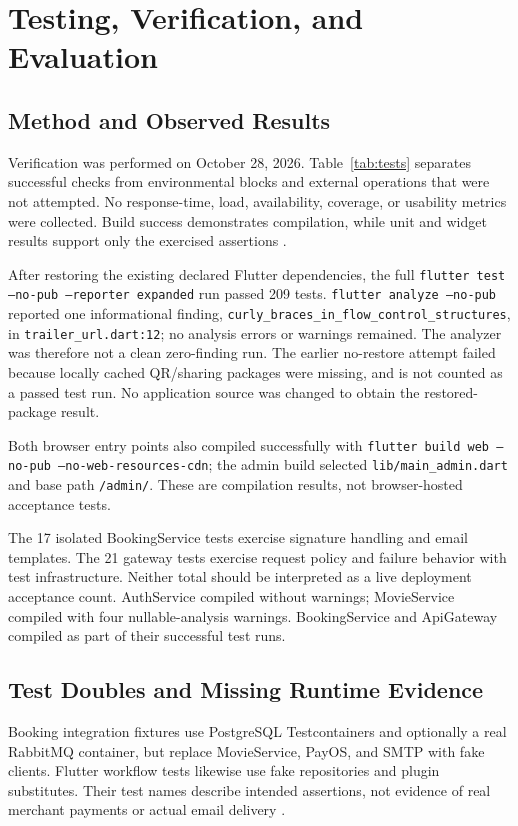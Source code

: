 \documentclass[conference]{IEEEtran}
\newcommand{\code}[1]{\texttt{#1}}
\begin{document}
\section{Testing, Verification, and Evaluation}
\subsection{Method and Observed Results}
Verification was performed on October 28, 2026. Table~\ref{tab:tests} separates
successful checks from environmental blocks and external operations that were
not attempted. No response-time, load, availability, coverage, or usability
metrics were collected. Build success demonstrates compilation, while unit and
widget results support only the exercised assertions \cite{tests,fluttertest}.


After restoring the existing declared Flutter dependencies, the full
\code{flutter test --no-pub --reporter expanded} run passed 209 tests.
\code{flutter analyze --no-pub} reported one informational finding,
\code{curly\_braces\_in\_flow\_control\_structures}, in
\code{trailer\_url.dart:12}; no analysis errors or warnings remained.
The analyzer was therefore not a clean zero-finding run. The earlier
no-restore attempt failed because locally cached QR/sharing packages were
missing, and is not counted as a passed test run. No application source
was changed to obtain the restored-package result.

Both browser entry points also compiled successfully with
\code{flutter build web --no-pub --no-web-resources-cdn}; the admin build
selected \code{lib/main\_admin.dart} and base path \code{/admin/}.
These are compilation results, not browser-hosted acceptance tests.



The 17 isolated BookingService tests exercise signature handling and email
templates. The 21 gateway tests exercise request policy and failure behavior
with test infrastructure. Neither total should be interpreted as a live
deployment acceptance count. AuthService compiled without warnings; MovieService
compiled with four nullable-analysis warnings. BookingService and ApiGateway
compiled as part of their successful test runs.

\subsection{Test Doubles and Missing Runtime Evidence}
Booking integration fixtures use PostgreSQL Testcontainers and optionally a
real RabbitMQ container, but replace MovieService, PayOS, and SMTP with fake
clients. Flutter workflow tests likewise use fake repositories and plugin
substitutes. Their test names describe intended assertions, not evidence of
real merchant payments or actual email delivery \cite{tests}.
\end{document}
